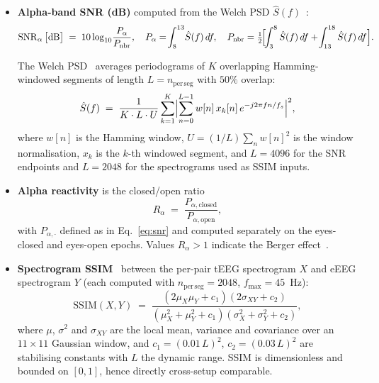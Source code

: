 \documentclass[10pt,a4paper]{article}
\begin{document}
\begin{itemize}
\item \textbf{Alpha-band SNR (dB)} computed from the Welch PSD $\hat{S}(f)$~\cite{welch1967}:
  \begin{equation}
  \mathrm{SNR}_{\alpha}\,\bigl[\mathrm{dB}\bigr]
  \;=\;
  10\log_{10}\!\frac{P_{\alpha}}{P_{\mathrm{nbr}}},
  \quad
  P_{\alpha}=\!\int_{8}^{13}\!\hat{S}(f)\,df,
  \quad
  P_{\mathrm{nbr}}=\tfrac{1}{2}\!\Bigl[\!\int_{3}^{8}\hat{S}(f)\,df + \!\int_{13}^{18}\hat{S}(f)\,df\Bigr].
  \label{eq:snr}
  \end{equation}

  The Welch PSD~\cite{welch1967} averages periodograms of $K$ overlapping Hamming-windowed segments of length $L=n_{\mathrm{per\,seg}}$ with $50\%$ overlap:
  \begin{equation}
  \hat{S}(f)
  \;=\;
  \frac{1}{K \cdot L \cdot U}\sum_{k=1}^{K}\Bigl|\sum_{n=0}^{L-1}w[n]\,x_{k}[n]\,e^{-j2\pi f n/f_{s}}\Bigr|^{2},
  \label{eq:welch}
  \end{equation}
  where $w[n]$ is the Hamming window, $U=(1/L)\sum_{n}w[n]^{2}$ is the window normalisation, $x_{k}$ is the $k$-th windowed segment, and $L=4096$ for the SNR endpoints and $L=2048$ for
   the spectrograms used as SSIM inputs.
\item \textbf{Alpha reactivity} is the closed/open ratio
  \begin{equation}
  R_{\alpha} \;=\; \frac{P_{\alpha,\mathrm{closed}}}{P_{\alpha,\mathrm{open}}},
  \label{eq:reactivity}
  \end{equation}
  with $P_{\alpha,\cdot}$ defined as in Eq.~\eqref{eq:snr} and computed separately on the eyes-closed and eyes-open epochs. Values $R_{\alpha}>1$ indicate the Berger
  effect~\cite{kirschfeld2005}.
\item \textbf{Spectrogram SSIM}~\cite{wang2004} between the per-pair tEEG spectrogram $X$ and eEEG spectrogram $Y$ (each computed with $n_{\mathrm{per\,seg}}=2048$,
  $f_{\max}=45$~Hz):
  \begin{equation}
  \mathrm{SSIM}(X,Y)
  \;=\;
  \frac{(2\mu_{X}\mu_{Y}+c_{1})(2\sigma_{XY}+c_{2})}
       {(\mu_{X}^{2}+\mu_{Y}^{2}+c_{1})(\sigma_{X}^{2}+\sigma_{Y}^{2}+c_{2})},
  \label{eq:ssim}
  \end{equation}
  where $\mu$, $\sigma^{2}$ and $\sigma_{XY}$ are the local mean, variance and covariance over an $11\times11$ Gaussian window, and $c_{1}=(0.01\,L)^{2}$, $c_{2}=(0.03\,L)^{2}$ are
  stabilising constants with $L$ the dynamic range. SSIM is dimensionless and bounded on $[0,1]$, hence directly cross-setup comparable.



\end{itemize}
\end{document}
